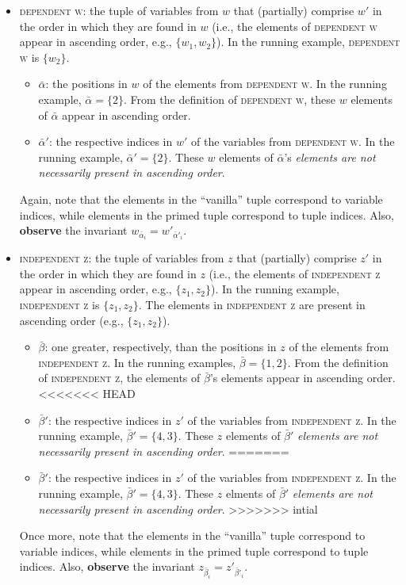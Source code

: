 \documentclass{article}
\newcommand{\1}{(\textos{1})\!}
\newcommand{\2}{(\textos{2})\!}
\newcommand{\3}{(\textos{3})\!}
\newcommand{\4}{(\textos{4})\!}
\newcommand{\5}{(\textos{5})\!}
\newcommand{\6}{(\textos{6})\!}
\newcommand{\7}{(\textos{7})\!}
\newcommand{\8}{(\textos{8})\!}
\begin{document}
\begin{itemize}
	\item \textsc{dependent w}: the tuple of variables from $w$ that (partially) comprise $w'$ in the order in which they are found in $w$ (i.e., the elements of \textsc{dependent w} appear in ascending order, e.g., $\{ w_1, w_2 \}$). In the running example, \textsc{dependent w} is $\{ w_2 \}$.
		\begin{itemize}
			\item $\bar{\alpha}$: the positions in $w$ of the elements from \textsc{dependent w}. In the running example, $\bar{\alpha} = \{ 2 \}$. From the definition of \textsc{dependent w}, these $w$ elements of $\bar{\alpha}$ appear in ascending order.
			\item $\bar{\alpha}'$: the respective indices in $w'$ of the variables from \textsc{dependent w}. In the running example, $\bar{\alpha}' = \{ 2 \}$. These $w$ elements of $\bar{\alpha}$'s \emph{elements are not necessarily present in ascending order}.
		\end{itemize}
		Again, note that the elements in the ``vanilla'' tuple correspond to variable indices, while elements in the primed tuple correspond to tuple indices. Also, \textbf{observe} the invariant $w_{\bar{\alpha}_i} = w'_{\bar{\alpha}'_i}$.
	\item \textsc{independent z}: the tuple of variables from $z$ that (partially) comprise $z'$ in the order in which they are found in $z$ (i.e., the elements of \textsc{independent z} appear in ascending order, e.g., $\{ z_1, z_2 \}$). In the running example, \textsc{independent z} is $\{ z_1, z_2 \}$. The elements in \textsc{independent z} are present in ascending order (e.g., $\{ z_1, z_2 \}$).
		\begin{itemize}
			\item $\bar{\beta}$: one greater, respectively, than the positions in $z$ of the elements from \textsc{independent z}. In the running examples, $\bar{\beta} = \{1, 2 \}$. From the definition of \textsc{independent z}, the elements of $\bar{\beta}$'s elements appear in ascending order.
<<<<<<< HEAD
			\item $\bar{\beta}'$: the respective indices in $z'$ of the variables from \textsc{independent z}. In the running example, $\bar{\beta}' = \{4, 3 \}$. These $z$ elements of $\bar{\beta}'$ \emph{elements are not necessarily present in ascending order}.
=======
			\item $\bar{\beta}'$: the respective indices in $z'$ of the variables from \textsc{independent z}. In the running example, $\bar{\beta}' = \{4, 3 \}$. These $z$ elments of $\bar{\beta}'$ \emph{elements are not necessarily present in ascending order}.
>>>>>>> intial
		\end{itemize}
		Once more, note that the elements in the ``vanilla'' tuple correspond to variable indices, while elements in the primed tuple correspond to tuple indices. Also, \textbf{observe} the invariant $z_{\bar{\beta}_i} = z'_{\bar{\beta}'_i}$.
\end{itemize}
\end{document}
